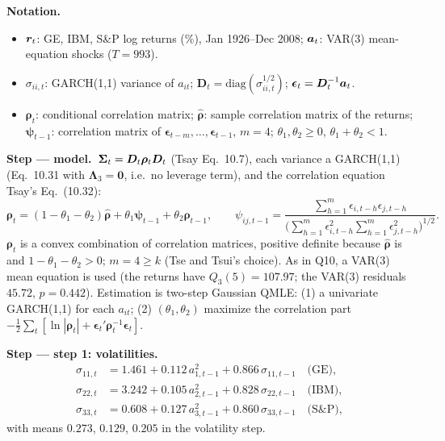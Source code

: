 \documentclass[11pt,a4paper]{article}
\newenvironment{notacao}{\par\smallskip\noindent\textbf{Notation.}\begin{itemize}[leftmargin=1.4em,topsep=1pt,itemsep=0pt]\small}{\end{itemize}}
\newcommand{\passo}[2]{\par\smallskip\noindent\textbf{Step --- #1.}~#2}
\begin{document}
\begin{sol}
\begin{notacao}
\item $\bm{r}_t$: GE, IBM, S\&P log returns (\%), Jan 1926--Dec 2008; $\bm{a}_t$: VAR(3) mean-equation shocks ($T=993$).
\item $\sigma_{ii,t}$: GARCH(1,1) variance of $a_{it}$; $\bm D_t=\mathrm{diag}(\sigma_{ii,t}^{1/2})$; $\bm\epsilon_t=\bm D_t^{-1}\bm{a}_t$.
\item $\bm\rho_t$: conditional correlation matrix; $\hat{\bm\rho}$: sample correlation matrix of the returns;
$\bm\psi_{t-1}$: correlation matrix of $\bm\epsilon_{t-m},\dots,\bm\epsilon_{t-1}$, $m=4$; $\theta_1,\theta_2\ge0$, $\theta_1+\theta_2<1$.
\end{notacao}

\passo{model}{$\bm{\Sigma}_t=\bm D_t\bm\rho_t\bm D_t$ (Tsay Eq.~10.7), each variance a GARCH(1,1) (Eq.~10.31 with
$\bm\Lambda_3=\bm0$, i.e.\ no leverage term), and the correlation equation Tsay's Eq.~(10.32):
\begin{equation}
\bm\rho_t=(1-\theta_1-\theta_2)\hat{\bm\rho}+\theta_1\bm\psi_{t-1}+\theta_2\bm\rho_{t-1},\qquad
\psi_{ij,t-1}=\frac{\sum_{h=1}^{m}\epsilon_{i,t-h}\epsilon_{j,t-h}}{\big(\sum_{h=1}^{m}\epsilon_{i,t-h}^2\sum_{h=1}^{m}\epsilon_{j,t-h}^2\big)^{1/2}}.\label{eq:q11dcc}
\end{equation}
$\bm\rho_t$ is a convex combination of correlation matrices, positive definite because $\hat{\bm\rho}$ is
and $1-\theta_1-\theta_2>0$; $m=4\geq k$ (Tse and Tsui's choice). As in Q10, a VAR(3) mean equation is used
(the returns have $Q_3(5)=107.97$; the VAR(3) residuals $45.72$, $p=0.442$). Estimation is two-step Gaussian
QMLE: (1) a univariate GARCH(1,1) for each $a_{it}$; (2) $(\theta_1,\theta_2)$ maximize the correlation part
$-\tfrac12\sum_t[\ln|\bm\rho_t|+\bm\epsilon_t'\bm\rho_t^{-1}\bm\epsilon_t]$.}

\passo{step 1: volatilities}{
\begin{align}
\sigma_{11,t}&=1.461+0.112\,a_{1,t-1}^2+0.866\,\sigma_{11,t-1}\quad\text{(GE)},\nonumber\\
\sigma_{22,t}&=3.242+0.105\,a_{2,t-1}^2+0.828\,\sigma_{22,t-1}\quad\text{(IBM)},\nonumber\\
\sigma_{33,t}&=0.608+0.127\,a_{3,t-1}^2+0.860\,\sigma_{33,t-1}\quad\text{(S\&P)},\nonumber
\end{align}
with means $0.273$, $0.129$, $0.205$ in the volatility step.}


\end{sol}
\end{document}
